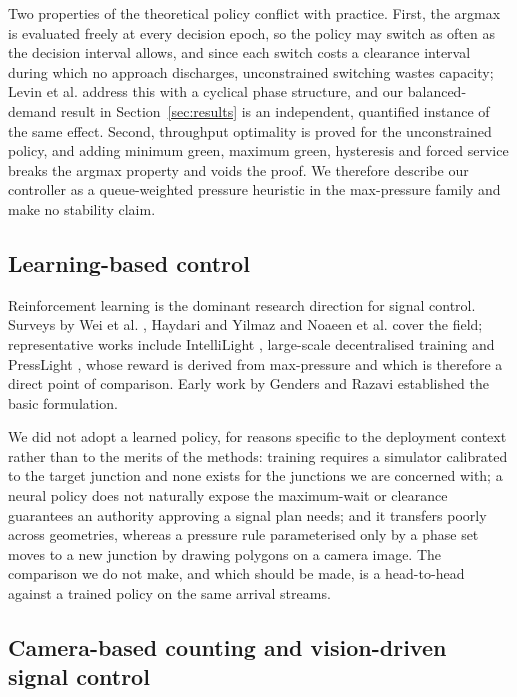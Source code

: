 \documentclass[journal]{IEEEtran}
\begin{document}
Two properties of the theoretical policy conflict with practice. First, the argmax is evaluated freely at
every decision epoch, so the policy may switch as often as the decision interval allows, and since each
switch costs a clearance interval during which no approach discharges, unconstrained switching wastes
capacity; Levin et al. \cite{Levin2020CyclicalMaxPressure} address this with a cyclical phase structure,
and our balanced-demand result in Section~\ref{sec:results} is an independent, quantified instance of the
same effect. Second, throughput optimality is proved for the unconstrained policy, and adding minimum
green, maximum green, hysteresis and forced service breaks the argmax property and voids the proof. We
therefore describe our controller as a queue-weighted pressure heuristic in the max-pressure family and
make no stability claim.

\subsection{Learning-based control}

Reinforcement learning is the dominant research direction for signal control. Surveys by Wei et al.
\cite{wei2021recent}, Haydari and Yilmaz \cite{haydari2022deep} and Noaeen et al.
\cite{noaeen2022reinforcement} cover the field; representative works include IntelliLight
\cite{wei2018intellilight}, large-scale decentralised training \cite{chen2020thousand} and
PressLight \cite{wei2019presslight}, whose reward is derived from max-pressure and which is
therefore a direct point of comparison. Early work by Genders and Razavi
\cite{genders2016using} established the basic formulation.

We did not adopt a learned policy, for reasons specific to the deployment context rather than to the
merits of the methods: training requires a simulator calibrated to the target junction and none exists
for the junctions we are concerned with; a neural policy does not naturally expose the maximum-wait or
clearance guarantees an authority approving a signal plan needs; and it transfers poorly across
geometries, whereas a pressure rule parameterised only by a phase set moves to a new junction by
drawing polygons on a camera image. The comparison we do not make, and which should be made, is a
head-to-head against a trained policy on the same arrival streams.

\subsection{Camera-based counting and vision-driven signal control}
\end{document}
